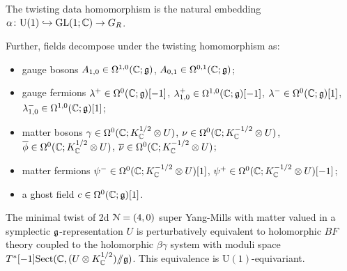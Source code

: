 \documentclass[10pt, oneside]{article}
\newcommand{\Sect}{\mathrm{Sect}}
\renewcommand{\U}{\mathrm{U}}
\newcommand{\ham}{/\!\!/}
\begin{document}
The twisting data homomorphism is the natural embedding $\alpha \colon \U(1) \hookrightarrow \GL(1;\CC) \to G_R$. 

Further, fields decompose under the twisting homomorphism as:
\begin{itemize}
\item gauge bosons $A_{1,0} \in \Omega^{1,0}(\mathbb C ; \mathfrak g)$, $A_{0,1} \in \Omega^{0,1}(\mathbb C ; \mathfrak g)$;
\item gauge fermions $\lambda^+ \in \Omega^0(\mathbb C ; \mathfrak g)[-1]$, $\lambda^+_{1,0} \in \Omega^{1,0}(\mathbb C ; \mathfrak g) [-1]$,  $\lambda^- \in \Omega^0(\mathbb C ; \mathfrak g)[1]$, $\lambda^-_{1,0} \in \Omega^{1,0}(\mathbb C ; \mathfrak g) [1]$;
\item matter bosons $\gamma \in \Omega^0(\mathbb C ; K_{\mathbb C}^{1/2} \otimes U)$, $\nu \in \Omega^0(\mathbb C ; K_{\mathbb C}^{-1/2} \otimes U)$, $\overline{\phi} \in \Omega^0(\mathbb C ; K_{\mathbb C}^{1/2} \otimes U)$, $\overline{\nu} \in \Omega^0(\mathbb C ; K_{\mathbb C}^{-1/2} \otimes U)$;
\item matter fermions $\psi^- \in \Omega^{0}(\mathbb C ; K_\mathbb C^{-1/2} \otimes U)[1]$, $\psi^+ \in \Omega^{0}(\mathbb C ; K_\mathbb C^{-1/2} \otimes U)[-1]$;
\item a ghost field $c \in \Omega^0(\mathbb C ; \mathfrak g)[1]$.
\end{itemize}



\begin{theorem} \label{thm: 2d(2,0)}
The minimal twist of 2d $\mathcal N=(4,0)$ super Yang-Mills with matter valued in a symplectic $\mathfrak g$-representation $U$ is perturbatively equivalent to holomorphic $BF$ theory coupled to the holomorphic $\beta\gamma$ system with moduli space $T^*[-1] \Sect(\CC , (U \otimes K^{1/2}_{\CC}) \ham \fg)$.
This equivalence is $\U(1)$-equivariant.
\end{theorem}
\end{document}
